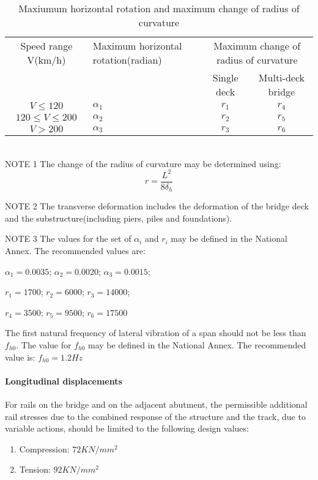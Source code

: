 \begin{table}[h]
	\centering
	\begin{tabularx}{0.8\textwidth}{cXcc}
	\hline
	Speed range V(km/h) & Maximum horizontal rotation(radian) & \multicolumn{2}{c}{Maximum change of radius of curvature}\\
	& & Single deck & Multi-deck bridge\\
	\hline
	$ V\leq 120 $ & $ \alpha_1 $ & $ r_1 $ & $ r_4 $ \\
	$ 120\leq V \leq 200 $ & $\alpha_2 $ & $r_2$ & $ r_5 $ \\
	$V>200$ & $ \alpha_3 $ & $r_3$ & $r_6$\\
	\hline
	\end{tabularx}
	\\
	NOTE 1 The change of the radius of curvature may be determined using:
			$$ r = \frac{L^2}{8 \delta_h}$$
			
	NOTE 2 The transverse deformation includes the deformation of the bridge deck and the substructure(including piers, piles and foundations).
			
	NOTE 3 The values for the set of $\alpha_i$ and $r_i$ may be defined in the National Annex. The recommended values are:
			
	$ \alpha_1 = 0.0035$; $\alpha_2=0.0020$; $\alpha_3=0.0015$;
			
	$ r_1  =1700$; $r_2=6000$; $r_3=14000$;
			
	$ r_4 = 3500$; $r_5 = 9500$; $ r_6 = 17500$
	
	\caption{Maxiumum horizontal rotation and maximum change of radius of curvature}
	\label{tab:maximumhorizontalrotation}
\end{table}

The first natural frequency of lateral vibration of a span should not be less than $f_{h0}$. The value for $f_{h0}$ may be defined in the National Annex. The recommended value is: $f_{h0}=1.2 Hz$

\paragraph{Longitudinal displacements}
For rails on the bridge and on the adjacent abutment, the permissible additional rail stresses due to the combined response of the structure and the track, due to variable actions, should be limited to the following design values:

\begin{enumerate}
	\item Compression: $72KN/mm^2$
	\item Tension: $92KN/mm^2$
\end{enumerate}

